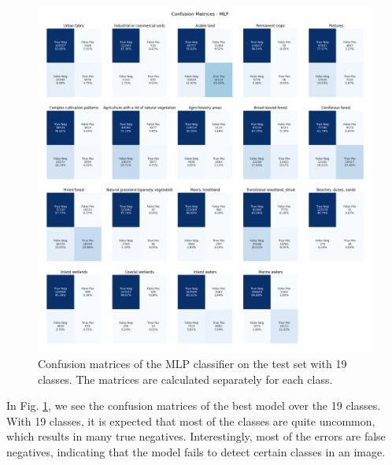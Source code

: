 \begin{figure}[h]
  \centering
  \includegraphics[width=\columnwidth]{images/MLP - confusion matrix.png}
  \caption{Confusion matrices of the MLP classifier on the test set with 19 classes. The matrices are calculated separately for each class.}
  \label{fig:confusion-matrix}
\end{figure}

In Fig. \ref{fig:confusion-matrix}, we see the confusion matrices of the best model over the 19 classes. With 19 classes, it is expected that most of the classes are quite uncommon, which results in many true negatives. Interestingly, most of the errors are false negatives, indicating that the model fails to detect certain classes in an image.